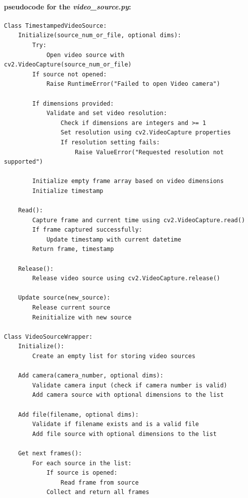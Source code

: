 \documentclass[12pt]{article}
\begin{document}
\begin{enumerate}
\begin{enumerate}
                        \paragraph{pseudocode for the \emph{video\_source.py}:}
                        \begin{verbatim}
Class TimestampedVideoSource:
    Initialize(source_num_or_file, optional dims):
        Try:
            Open video source with cv2.VideoCapture(source_num_or_file)
        If source not opened:
            Raise RuntimeError("Failed to open Video camera")

        If dimensions provided:
            Validate and set video resolution:
                Check if dimensions are integers and >= 1
                Set resolution using cv2.VideoCapture properties
                If resolution setting fails:
                    Raise ValueError("Requested resolution not supported")

        Initialize empty frame array based on video dimensions
        Initialize timestamp

    Read():
        Capture frame and current time using cv2.VideoCapture.read()
        If frame captured successfully:
            Update timestamp with current datetime
        Return frame, timestamp

    Release():
        Release video source using cv2.VideoCapture.release()

    Update source(new_source):
        Release current source
        Reinitialize with new source

Class VideoSourceWrapper:
    Initialize():
        Create an empty list for storing video sources

    Add camera(camera_number, optional dims):
        Validate camera input (check if camera number is valid)
        Add camera source with optional dimensions to the list

    Add file(filename, optional dims):
        Validate if filename exists and is a valid file
        Add file source with optional dimensions to the list

    Get next frames():
        For each source in the list:
            If source is opened:
                Read frame from source
            Collect and return all frames


\end{verbatim}
\end{enumerate}
\end{enumerate}
\end{document}
